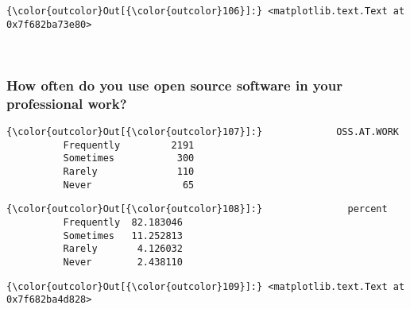 \documentclass[11pt]{article}
\begin{document}
            \begin{Verbatim}[commandchars=\\\{\}]
{\color{outcolor}Out[{\color{outcolor}106}]:} <matplotlib.text.Text at 0x7f682ba73e80>
\end{Verbatim}
        
    \begin{center}
    \end{center}
    { \hspace*{\fill} \\}
    
    \subsubsection{How often do you use open source software in your
professional
work?}\label{how-often-do-you-use-open-source-software-in-your-professional-work}


            \begin{Verbatim}[commandchars=\\\{\}]
{\color{outcolor}Out[{\color{outcolor}107}]:}             OSS.AT.WORK
          Frequently         2191
          Sometimes           300
          Rarely              110
          Never                65
\end{Verbatim}
        

            \begin{Verbatim}[commandchars=\\\{\}]
{\color{outcolor}Out[{\color{outcolor}108}]:}               percent
          Frequently  82.183046
          Sometimes   11.252813
          Rarely       4.126032
          Never        2.438110
\end{Verbatim}
        

            \begin{Verbatim}[commandchars=\\\{\}]
{\color{outcolor}Out[{\color{outcolor}109}]:} <matplotlib.text.Text at 0x7f682ba4d828>
\end{Verbatim}
        
    \begin{center}
    \end{center}
    { \hspace*{\fill} \\}
    
\end{document}
